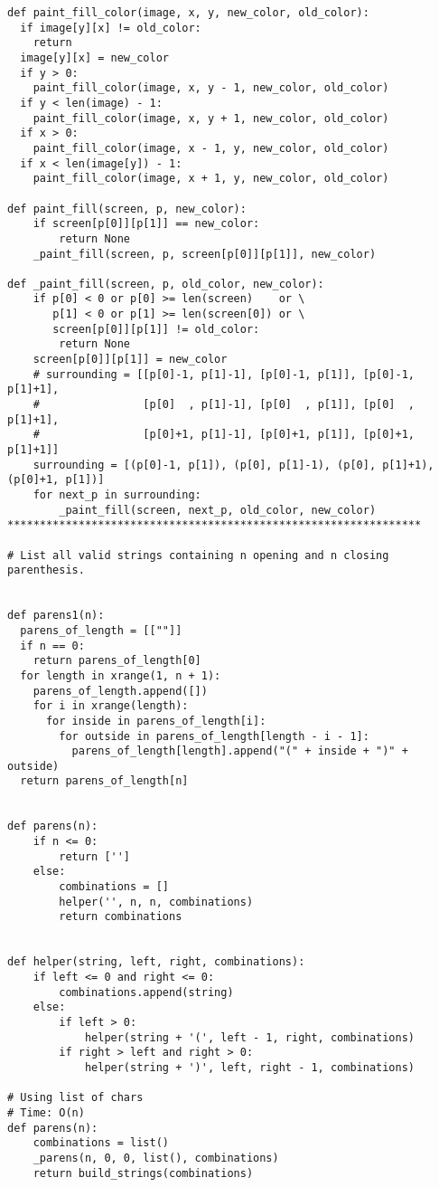 \documentclass[12pt]{article}
\begin{document}
\begin{lstlisting}
def paint_fill_color(image, x, y, new_color, old_color):
  if image[y][x] != old_color:
    return
  image[y][x] = new_color
  if y > 0:
    paint_fill_color(image, x, y - 1, new_color, old_color)
  if y < len(image) - 1:
    paint_fill_color(image, x, y + 1, new_color, old_color)
  if x > 0:
    paint_fill_color(image, x - 1, y, new_color, old_color)
  if x < len(image[y]) - 1:
    paint_fill_color(image, x + 1, y, new_color, old_color)

def paint_fill(screen, p, new_color):
    if screen[p[0]][p[1]] == new_color:
        return None
    _paint_fill(screen, p, screen[p[0]][p[1]], new_color)

def _paint_fill(screen, p, old_color, new_color):
    if p[0] < 0 or p[0] >= len(screen)    or \
       p[1] < 0 or p[1] >= len(screen[0]) or \
       screen[p[0]][p[1]] != old_color:
        return None
    screen[p[0]][p[1]] = new_color
    # surrounding = [[p[0]-1, p[1]-1], [p[0]-1, p[1]], [p[0]-1, p[1]+1],
    #                [p[0]  , p[1]-1], [p[0]  , p[1]], [p[0]  , p[1]+1],
    #                [p[0]+1, p[1]-1], [p[0]+1, p[1]], [p[0]+1, p[1]+1]]
    surrounding = [(p[0]-1, p[1]), (p[0], p[1]-1), (p[0], p[1]+1), (p[0]+1, p[1])]
    for next_p in surrounding:
        _paint_fill(screen, next_p, old_color, new_color)
****************************************************************

# List all valid strings containing n opening and n closing parenthesis.


def parens1(n):
  parens_of_length = [[""]]
  if n == 0:
    return parens_of_length[0]
  for length in xrange(1, n + 1):
    parens_of_length.append([])
    for i in xrange(length):
      for inside in parens_of_length[i]:
        for outside in parens_of_length[length - i - 1]:
          parens_of_length[length].append("(" + inside + ")" + outside)
  return parens_of_length[n]


def parens(n):
    if n <= 0:
        return ['']
    else:
        combinations = []
        helper('', n, n, combinations)
        return combinations


def helper(string, left, right, combinations):
    if left <= 0 and right <= 0:
        combinations.append(string)
    else:
        if left > 0:
            helper(string + '(', left - 1, right, combinations)
        if right > left and right > 0:
            helper(string + ')', left, right - 1, combinations)

# Using list of chars
# Time: O(n)
def parens(n):
    combinations = list()
    _parens(n, 0, 0, list(), combinations)
    return build_strings(combinations)


\end{lstlisting}
\end{document}
